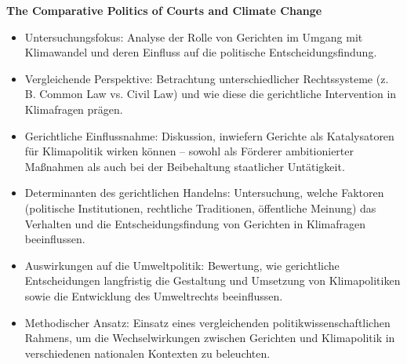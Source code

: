 \documentclass[a4paper, 12pt]{article} %
\begin{document}
\textbf{\cite{Vanhala01052013} The Comparative Politics of Courts and Climate Change}

\begin{itemize}
   \item Untersuchungsfokus: Analyse der Rolle von Gerichten im Umgang mit Klimawandel und deren Einfluss auf die politische Entscheidungsfindung.
   \item Vergleichende Perspektive: Betrachtung unterschiedlicher Rechtssysteme (z. B. Common Law vs. Civil Law) und wie diese die gerichtliche Intervention in Klimafragen prägen.
   \item Gerichtliche Einflussnahme: Diskussion, inwiefern Gerichte als Katalysatoren für Klimapolitik wirken können – sowohl als Förderer ambitionierter Maßnahmen als auch bei der Beibehaltung staatlicher Untätigkeit.
   \item Determinanten des gerichtlichen Handelns: Untersuchung, welche Faktoren (politische Institutionen, rechtliche Traditionen, öffentliche Meinung) das Verhalten und die Entscheidungsfindung von Gerichten in Klimafragen beeinflussen.
   \item Auswirkungen auf die Umweltpolitik: Bewertung, wie gerichtliche Entscheidungen langfristig die Gestaltung und Umsetzung von Klimapolitiken sowie die Entwicklung des Umweltrechts beeinflussen.
   \item Methodischer Ansatz: Einsatz eines vergleichenden politikwissenschaftlichen Rahmens, um die Wechselwirkungen zwischen Gerichten und Klimapolitik in verschiedenen nationalen Kontexten zu beleuchten.
\end{itemize}

\clearpage

\begingroup
\renewcommand{\bibfont}{\fontsize{13pt}{12pt}\selectfont}  
\sloppy
\nocite{*}
\printbibliography{}
\end{document}
